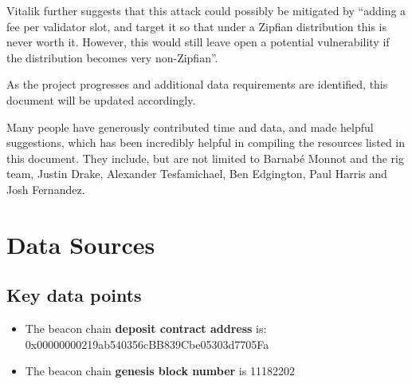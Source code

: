 \documentclass[UTF8]{article}
\begin{document}
Vitalik further suggests that this attack could possibly be mitigated by ``adding a fee per validator slot, and target it so that under a Zipfian distribution this is never worth it. However, this would still leave open a potential vulnerability if the distribution becomes very non-Zipfian''. 

As the project progresses and additional data requirements are identified, this document will be updated accordingly.

Many people have generously contributed time and data, and made helpful suggestions, which has been incredibly helpful in compiling the resources listed in this document. They include, but are not limited to Barnabé Monnot and the \gls{rig} team, Justin Drake, Alexander Tesfamichael, Ben Edgington, Paul Harris and Josh Fernandez.

\section{Data Sources}
\label{sec:sources}
\subsection{Key data points}
\begin{itemize}
\item The beacon chain \textbf{deposit contract address} is: 0x00000000219ab540356cBB839Cbe05303d7705Fa 
\item The beacon chain \textbf{genesis block number} is 11182202
\end{itemize}

\end{document}
